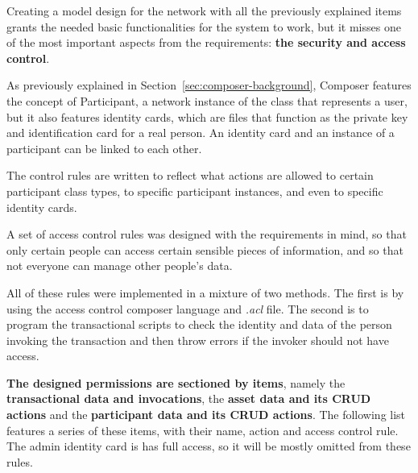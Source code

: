 Creating a model design for the network with all the previously explained items grants the needed basic functionalities for the system to work, but it misses one of the most important aspects from the requirements: \textbf{the security and access control}.

As previously explained in Section~\ref{sec:composer-background}, Composer features the concept of Participant, a network instance of the class that represents a user, but it also features identity cards, which are files that function as the private key and identification card for a real person. An identity card and an instance of a participant can be linked to each other.

The control rules are written to reflect what actions are allowed to certain participant class types, to specific participant instances, and even to specific identity cards. 


A set of access control rules was designed with the requirements in mind, so that only certain people can access certain sensible pieces of information, and so that not everyone can manage other people's data. 

 All of these rules were implemented in a mixture of two methods. The first is by using the access control composer language and \textit{.acl} file. The second is to program the transactional scripts to check the identity and data of the person invoking the transaction and then throw errors if the invoker should not have access.

 \textbf{The designed permissions are sectioned by items}, namely the \textbf{transactional data and invocations}, the \textbf{asset data and its CRUD actions} and the \textbf{participant data and its CRUD actions}. The following list features a series of these items, with their name, action and access control rule. The admin identity card is has full access, so it will be mostly omitted from these rules.

